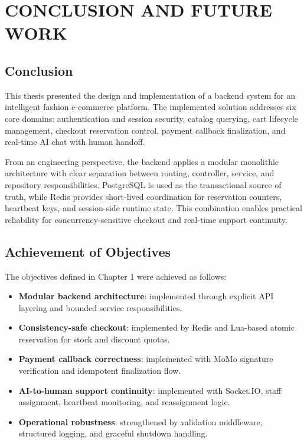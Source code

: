 \chapter{CONCLUSION AND FUTURE WORK}
\label{ch:conclusion-future-work}

\section{Conclusion}

This thesis presented the design and implementation of a backend system for an intelligent fashion e-commerce platform. The implemented solution addresses six core domains: authentication and session security, catalog querying, cart lifecycle management, checkout reservation control, payment callback finalization, and real-time AI chat with human handoff.

From an engineering perspective, the backend applies a modular monolithic architecture with clear separation between routing, controller, service, and repository responsibilities. PostgreSQL is used as the transactional source of truth, while Redis provides short-lived coordination for reservation counters, heartbeat keys, and session-side runtime state. This combination enables practical reliability for concurrency-sensitive checkout and real-time support continuity.

\section{Achievement of Objectives}

The objectives defined in Chapter 1 were achieved as follows:
\begin{itemize}
    \item \textbf{Modular backend architecture}: implemented through explicit API layering and bounded service responsibilities.
    \item \textbf{Consistency-safe checkout}: implemented by Redis and Lua-based atomic reservation for stock and discount quotas.
    \item \textbf{Payment callback correctness}: implemented with MoMo signature verification and idempotent finalization flow.
    \item \textbf{AI-to-human support continuity}: implemented with Socket.IO, staff assignment, heartbeat monitoring, and reassignment logic.
    \item \textbf{Operational robustness}: strengthened by validation middleware, structured logging, and graceful shutdown handling.
\end{itemize}

